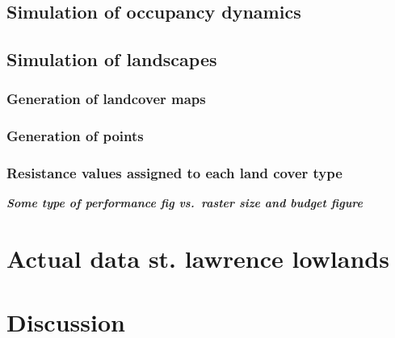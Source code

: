 \documentclass[11pt]{article}
\begin{document}
\hypertarget{simulation-of-occupancy-dynamics}{%
\subsection{Simulation of occupancy
dynamics}\label{simulation-of-occupancy-dynamics}}

\hypertarget{simulation-of-landscapes}{%
\subsection{Simulation of landscapes}\label{simulation-of-landscapes}}

\hypertarget{generation-of-landcover-maps}{%
\subsubsection{Generation of landcover
maps}\label{generation-of-landcover-maps}}

\hypertarget{generation-of-points}{%
\subsubsection{Generation of points}\label{generation-of-points}}

\hypertarget{resistance-values-assigned-to-each-land-cover-type}{%
\subsubsection{Resistance values assigned to each land cover
type}\label{resistance-values-assigned-to-each-land-cover-type}}

\textbf{\emph{Some type of performance fig vs.~raster size and budget
figure}}

\hypertarget{actual-data-st.-lawrence-lowlands}{%
\section{Actual data st. lawrence
lowlands}\label{actual-data-st.-lawrence-lowlands}}

\hypertarget{discussion}{%
\section{Discussion}\label{discussion}}
\end{document}
